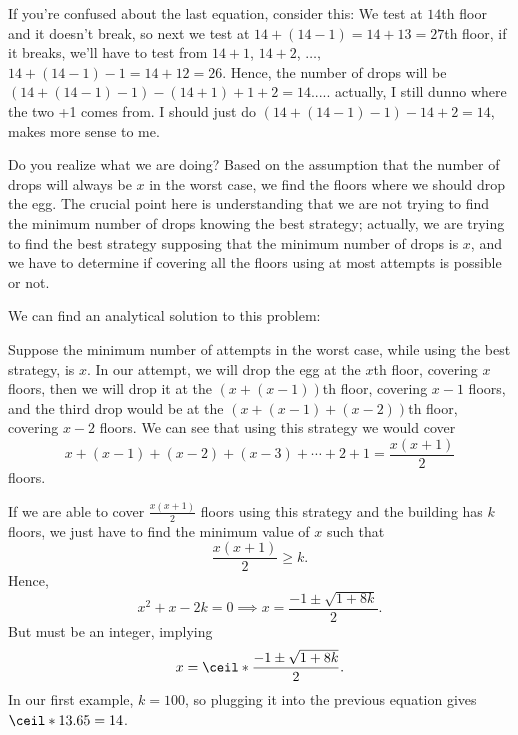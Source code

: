 If you're confused about the last equation, consider this: We test at $14$th
floor and it doesn't break, so next we test at $14+(14-1)=14+13=27$th floor,
if it breaks, we'll have to test from $14+1$, $14+2$, $\ldots,$
$14+(14-1)-1=14+12=26$. Hence, the number of drops will be
$(14+(14-1)-1)-(14+1)+1+2=14$..... actually, I still dunno where the two +1
comes from. I should just do $(14+(14-1)-1)-14 + 2=14$, makes more sense to
me.

Do you realize what we are doing? Based on the assumption that the number of
drops will always be $x$ in the worst case, we find the floors where we
should drop the egg. The crucial point here is understanding that we are not
trying to find the minimum number of drops knowing the best strategy;
actually, we are trying to find the best strategy supposing that the minimum
number of drops is $x$, and we have to determine if covering all the floors
using at most attempts is possible or not.

We can find an analytical solution to this problem:

\begin{mdframed}[style=mdfNOTE,
frametitle={Example}]

Suppose the minimum number of attempts in the worst case, while using the
best strategy, is $x$. In our attempt, we will drop the egg at the $x$th
floor, covering $x$ floors, then we will drop it at the $(x+(x-1))$th floor,
covering $x-1$ floors, and the third drop would be at the
$(x+(x-1)+(x-2))$th floor, covering $x-2$ floors. We can see that using this
strategy we would cover
\begin{equation*}
x+(x-1)+(x-2)+(x-3)+\cdots+2+1=\frac{x(x+1)}{2}
\end{equation*}
floors.

If we are able to cover $\frac{x(x+1)}{2}$ floors using this strategy and
the building has $k$ floors, we just have to find the minimum value of $x$
such that
\begin{equation*}
\frac{x(x+1)}{2}\geq k.
\end{equation*}
Hence,
\begin{equation*}
x^2+x-2k = 0 \implies x = \frac{-1\pm\sqrt{1+8k}}{2}.
\end{equation*}
But  must be an integer, implying
\begin{equation*}
x=\ceil*{\frac{-1\pm\sqrt{1+8k}}{2}}.
\end{equation*}
In our first example, $k=100$, so plugging it into the previous equation
gives $\ceil*{13.65}=14$.

\end{mdframed}

